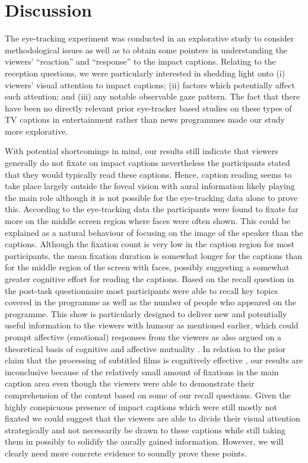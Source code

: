 \documentclass[output=paper]{langsci/langscibook}
\begin{document}
\section{Discussion}

The eye-tracking experiment was conducted in an explorative study to consider methodological issues as well as to obtain some pointers in understanding the viewers' ``reaction'' and ``response'' to the impact captions. Relating to the reception questions, we were particularly interested in shedding light onto (i) viewers' visual attention to impact captions; (ii) factors which potentially affect such attention; and (iii) any notable observable gaze pattern. The fact that there have been no directly relevant prior eye-tracker based studies on these types of TV captions in entertainment rather than news programmes made our study more explorative. 


\largerpage
With potential shortcomings in mind, our results still indicate that viewers generally do not fixate on impact captions nevertheless the participants stated that they would typically read these captions.  Hence, caption reading seems to take place largely outside the foveal vision with aural information likely playing the main role although it is not possible for the eye-tracking data alone to prove this. According to the eye-tracking data the participants were found to fixate far more on the middle screen region where faces were often shown. This could be explained as a natural behaviour of focusing on the image of the speaker than the captions. Although the fixation count is very low in the caption region for most participants, the mean fixation duration is somewhat longer for the captions than for the middle region of the screen with faces, possibly suggesting a somewhat greater cognitive effort for reading the captions. Based on the recall question in the post-task questionnaire most participants were able to recall key topics covered in the programme as well as the number of people who appeared on the programme. This show is particularly designed to deliver new and potentially useful information to the viewers with humour as mentioned earlier, which could prompt affective (emotional) responses from the viewers as also argued on a theoretical basis of cognitive and affective mutuality \citep{Shiota2003, Sasamoto2014}. In relation to the prior claim that the processing of subtitled films is cognitively effective \citep{perego2010}, our results are inconclusive because of the relatively small amount of fixations in the main caption area even though the viewers were able to demonstrate their comprehension of the content based on some of our recall questions.  Given the highly conspicuous presence of impact captions which were still mostly not fixated we could suggest that the viewers are able to divide their visual attention strategically and not necessarily be drawn to these captions while still taking them in possibly to solidify the aurally gained information.  However, we will clearly need more concrete evidence to soundly prove these points. 
\end{document}
